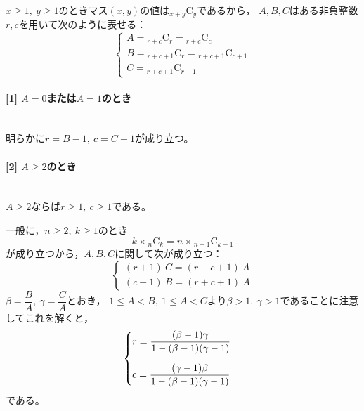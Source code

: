 \documentclass{article}
\newcommand{\myparagraph}[1]{\paragraph{#1}\mbox{}\\}
\newcommand{\combination}[2]{{}_{#1} \mathrm{C}_{#2}}
\begin{document}
$x \geq 1,\ y \geq 1$のときマス$(x, y)$の値は$\combination{x + y}{y}$であるから，
$A, B, C$はある非負整数$r, c$を用いて次のように表せる：
\begin{equation*}
    \begin{cases}
        A = \combination{r + c}{r} = \combination{r + c}{c} \\
        B = \combination{r + c + 1}{r} = \combination{r + c + 1}{c + 1} \\
        C = \combination{r + c + 1}{r + 1}
    \end{cases}
\end{equation*}

\myparagraph{[1] $A = 0$または$A = 1$のとき}

明らかに$r = B - 1,\ c = C - 1$が成り立つ。

\myparagraph{[2] $A \geq 2$のとき}

$A \geq 2$ならば$r \geq 1,\ c \geq 1$である。

一般に，$n \geq 2,\ k \geq 1$のとき
\begin{equation*}
    k \times \combination{n}{k} = n \times \combination{n - 1}{k - 1}
\end{equation*}
が成り立つから，$A, B, C$に関して次が成り立つ：
\begin{equation*}
    \begin{cases}
        (r + 1)\ C = (r + c + 1)\ A \\
        (c + 1)\ B = (r + c + 1)\ A
    \end{cases}
\end{equation*}
$\beta = \dfrac{B}{A},\ \gamma = \dfrac{C}{A}$とおき，
$1 \leq A < B,\ 1 \leq A < C$より$\beta > 1,\ \gamma > 1$であることに注意してこれを解くと，
\begin{equation*}
    \begin{cases}
        \vspace{10pt}
        r = \dfrac{(\beta  - 1) \gamma}{1 - (\beta - 1)(\gamma - 1)} \\
        c = \dfrac{(\gamma - 1) \beta }{1 - (\beta - 1)(\gamma - 1)}
    \end{cases}
\end{equation*}
である。
\end{document}

